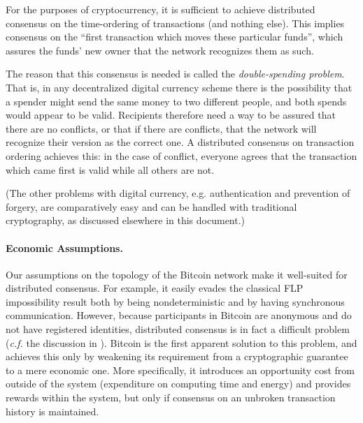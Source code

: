 \documentclass[letterpaper]{article}
\begin{document}
For the purposes of cryptocurrency, it is sufficient to achieve distributed consensus
on the time-ordering of transactions (and nothing else). This implies consensus on
the ``first transaction which moves these particular funds'', which assures the funds'
new owner that the network recognizes them as such.

The reason that this consensus is needed is called the \emph{double-spending problem}.
That is, in any decentralized digital currency scheme there is the possibility that
a spender might send the same money to two different people, and both spends would
appear to be valid. Recipients therefore need a way to be assured that there are no
conflicts, or that if there are conflicts, that the network will recognize their
version as the correct one. A distributed consensus on transaction ordering achieves
this: in the case of conflict, everyone agrees that the transaction which came first
is valid while all others are not.

(The other problems with digital currency, e.g. authentication and prevention of
forgery, are comparatively easy and can be handled with traditional cryptography,
as discussed elsewhere in this document.)

\paragraph{Economic Assumptions.} Our assumptions on the topology of the Bitcoin
network make it well-suited for distributed consensus. For example, it easily
evades the classical FLP impossibility result\cite{fischer+lynch+paterson1985}
both by being nondeterministic and by having synchronous communication. However,
because participants in Bitcoin are anonymous and do not have registered identities,
distributed consensus is in fact a difficult problem (\emph{c.f.} the discussion
in \cite{miller+laviola2014}). Bitcoin is the first apparent solution to this
problem, and achieves this only by weakening its requirement from a cryptographic guarantee
to a mere economic one. More specifically, it introduces an opportunity cost from outside of
the system (expenditure on computing time and energy) and provides rewards within
the system, but only if consensus on an unbroken transaction history is maintained.
\end{document}
